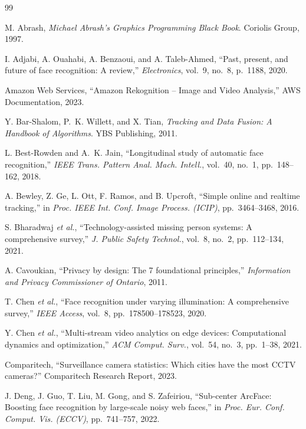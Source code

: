 \documentclass[12pt, a4paper]{article}
\begin{document}
\newpage
\begin{thebibliography}{99}

M. Abrash, \textit{Michael Abrash's Graphics Programming Black Book}. Coriolis Group, 1997.

I. Adjabi, A. Ouahabi, A. Benzaoui, and A. Taleb-Ahmed, ``Past, present, and future of face recognition: A review,'' \textit{Electronics}, vol.~9, no.~8, p.~1188, 2020.

Amazon Web Services, ``Amazon Rekognition -- Image and Video Analysis,'' AWS Documentation, 2023.

Y. Bar-Shalom, P.~K. Willett, and X. Tian, \textit{Tracking and Data Fusion: A Handbook of Algorithms}. YBS Publishing, 2011.

L. Best-Rowden and A.~K. Jain, ``Longitudinal study of automatic face recognition,'' \textit{IEEE Trans. Pattern Anal. Mach. Intell.}, vol.~40, no.~1, pp.~148--162, 2018.

A. Bewley, Z. Ge, L. Ott, F. Ramos, and B. Upcroft, ``Simple online and realtime tracking,'' in \textit{Proc. IEEE Int. Conf. Image Process. (ICIP)}, pp.~3464--3468, 2016.

S. Bharadwaj \textit{et al.}, ``Technology-assisted missing person systems: A comprehensive survey,'' \textit{J. Public Safety Technol.}, vol.~8, no.~2, pp.~112--134, 2021.

A. Cavoukian, ``Privacy by design: The 7 foundational principles,'' \textit{Information and Privacy Commissioner of Ontario}, 2011.

T. Chen \textit{et al.}, ``Face recognition under varying illumination: A comprehensive survey,'' \textit{IEEE Access}, vol.~8, pp.~178500--178523, 2020.

Y. Chen \textit{et al.}, ``Multi-stream video analytics on edge devices: Computational dynamics and optimization,'' \textit{ACM Comput. Surv.}, vol.~54, no.~3, pp.~1--38, 2021.

Comparitech, ``Surveillance camera statistics: Which cities have the most CCTV cameras?'' Comparitech Research Report, 2023.

J. Deng, J. Guo, T. Liu, M. Gong, and S. Zafeiriou, ``Sub-center ArcFace: Boosting face recognition by large-scale noisy web faces,'' in \textit{Proc. Eur. Conf. Comput. Vis. (ECCV)}, pp.~741--757, 2022.


\end{thebibliography}
\end{document}
